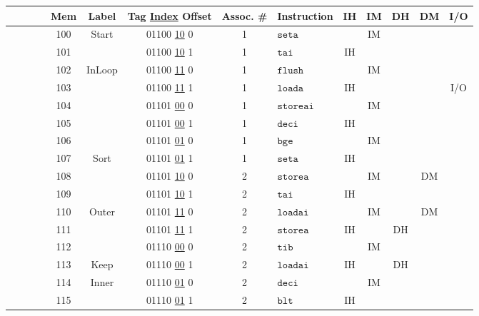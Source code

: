 \documentclass[a4paper]{article}
\begin{document}
\begin{center}
\begin{tabular}{|c|c|c|c|c|c|c|c|l|c|c|c|c|c|}
\hline
& & & & Mem & Label & Tag \underline{Index} Offset & Assoc. \# & Instruction & IH & IM & DH & DM & I/O \\
\hline
\hline
\cellcolor{black} & & & & 100 & Start & 01100 \underline{10} 0 & 1 & $\texttt{seta}$ &  & IM &  &  &  \\
\hline
\cellcolor{black} & & & & 101 & & 01100 \underline{10} 1 & 1 & $\texttt{tai}$ & IH &  &  &  &  \\
\hline
& & & \cellcolor{red} & 102 & InLoop & 01100 \underline{11} 0 & 1 & $\texttt{flush}$ &  & IM &  &  &  \\
\hline
& & & \cellcolor{red} & 103 & & 01100 \underline{11} 1 & 1 & $\texttt{loada}$ & IH &  &  &  & I/O \\
\hline
& & & \cellcolor{red} & 104 & & 01101 \underline{00} 0 & 1 & $\texttt{storeai}$ &  & IM &  &  &  \\
\hline
& & & \cellcolor{red} & 105 & & 01101 \underline{00} 1 & 1 & $\texttt{deci}$ & IH &  &  &  &  \\
\hline
& & & \cellcolor{red} & 106 & & 01101 \underline{01} 0 & 1 & $\texttt{bge}$ &  & IM &  &  &  \\
\hline
\cellcolor{black} & & & & 107 & Sort & 01101 \underline{01} 1 & 1 & $\texttt{seta}$ & IH &  &  &  &  \\
\hline
\cellcolor{black} & & & & 108 &  & 01101 \underline{10} 0 & 2 & $\texttt{storea}$ & & IM &  & DM &  \\
\hline
\cellcolor{black} & & & & 109 &  & 01101 \underline{10} 1 & 2 & $\texttt{tai}$ & IH &  &  &  &  \\
\hline
& & & \cellcolor{red} & 110 & Outer & 01101 \underline{11} 0 & 2 & $\texttt{loadai}$ &  & IM &  & DM &  \\
\hline
& & & \cellcolor{red} & 111 &  & 01101 \underline{11} 1 & 2 & $\texttt{storea}$ & IH &  & DH &  &  \\
\hline
& & & \cellcolor{red} & 112 &  & 01110 \underline{00} 0 & 2 & $\texttt{tib}$ &  & IM &  &  &  \\
\hline
& & \cellcolor{green} & & 113 & Keep & 01110 \underline{00} 1 & 2 & $\texttt{loadai}$ & IH &  & DH &  &  \\
\hline
& \cellcolor{yellow} & & & 114 & Inner & 01110 \underline{01} 0 & 2 & $\texttt{deci}$ &  & IM &  &  &  \\
\hline
& \cellcolor{yellow} & & & 115 &  & 01110 \underline{01} 1 & 2 & $\texttt{blt}$ & IH &  &  &  &  \\

\end{tabular}
\end{center}
\end{document}
